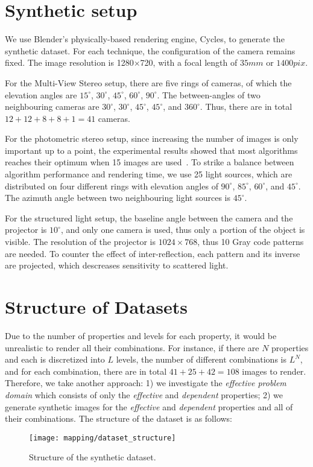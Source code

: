 \section{Synthetic setup}
We use Blender's physically-based rendering engine, Cycles, to generate the synthetic dataset. For each technique, the configuration of the camera remains fixed. The image resolution is 1280$\times$720, with a focal length of $35mm$ or $1400pix$.

For the Multi-View Stereo setup, there are five rings of cameras, of which the elevation angles are $15^\circ$, $30^\circ$, $45^\circ$, $60^\circ$, $90^\circ$. The between-angles of two neighbouring cameras are $30^\circ$, $30^\circ$, $45^\circ$, $45^\circ$, and $360^\circ$. Thus, there are in total $12+12+8+8+1=41$ cameras.

For the photometric stereo setup, since increasing the number of images is only important up to a point, the experimental results showed that most algorithms reaches their optimum when 15 images are used~\cite{Berkiten:2016:ARB}. To strike a balance between algorithm performance and rendering time, we use 25 light sources, which are distributed on four different rings with elevation angles of $90^\circ$, $85^\circ$, $60^\circ$, and $45^\circ$. The azimuth angle between two neighbouring light sources is $45^\circ$.

For the structured light setup, the baseline angle between the camera and the projector is $10^\circ$, and only one camera is used, thus only a portion of the object is visible. The resolution of the projector is $1024\times768$, thus 10 Gray code patterns are needed. To counter the effect of inter-reflection, each pattern and its inverse are projected, which descreases sensitivity to scattered light.

\section{Structure of Datasets}
Due to the number of properties and levels for each property, it would be unrealistic to render all their combinations. For instance, if there are $N$ properties and each is discretized into $L$ levels, the number of different combinations is $L^N$, and for each combination, there are in total $41+25+42=108$ images to render. Therefore, we take another approach: 1) we investigate the \textit{effective problem domain} which consists of only the \textit{effective} and \textit{dependent} properties; 2) we generate synthetic images for the \textit{effective} and \textit{dependent} properties and all of their combinations. The structure of the dataset is as follows:
\begin{figure}[!htbp]
\centering
\texttt{[image: mapping/dataset\_structure]}
\caption{Structure of the synthetic dataset.}
\label{fig:dataset_structure}
\end{figure}

